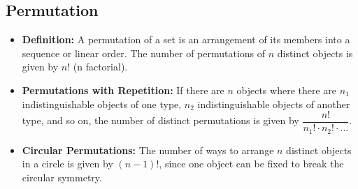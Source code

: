 \subsection{Permutation}

\begin{itemize}
    \item \textbf{Definition: } A permutation of a set is an arrangement of its members into a sequence or linear order. The number of permutations of $n$ distinct objects is given by $n!$ (n factorial).
    \item \textbf{Permutations with Repetition: } If there are $n$ objects where there are $n_1$ indistinguishable objects of one type, $n_2$ indistinguishable objects of another type, and so on, the number of distinct permutations is given by $\dfrac{n!}{n_1! \cdot n_2! \cdot ...}$.
    \item \textbf{Circular Permutations: } The number of ways to arrange $n$ distinct objects in a circle is given by $(n-1)!$, since one object can be fixed to break the circular symmetry.
\end{itemize}